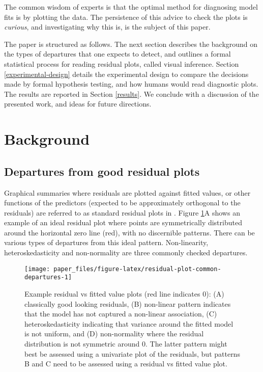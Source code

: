 \documentclass[]{interact}
\theoremstyle{plain}%
\theoremstyle{definition}
\theoremstyle{remark}
\begin{document}
The common wisdom of experts is that the optimal method for diagnosing
model fits is by plotting the data. The persistence of this advice to
check the plots is \emph{curious}, and investigating why this is, is the
subject of this paper.

The paper is structured as follows. The next section describes the
background on the types of departures that one expects to detect, and
outlines a formal statistical process for reading residual plots, called
visual inference. Section \ref{experimental-design} details the
experimental design to compare the decisions made by formal hypothesis
testing, and how humans would read diagnostic plots. The results are
reported in Section \ref{results}. We conclude with a discussion of the
presented work, and ideas for future directions.

\hypertarget{background}{%
\section{Background}\label{background}}

\hypertarget{departures-from-good-residual-plots}{%
\subsection{Departures from good residual
plots}\label{departures-from-good-residual-plots}}

Graphical summaries where residuals are plotted against fitted values,
or other functions of the predictors (expected to be approximately
orthogonal to the residuals) are referred to as standard residual plots
in \citet{cook1982residuals}. Figure
\ref{fig:residual-plot-common-departures}A shows an example of an ideal
residual plot where points are symmetrically distributed around the
horizontal zero line (red), with no discernible patterns. There can be
various types of departures from this ideal pattern. Non-linearity,
heteroskedasticity and non-normality are three commonly checked
departures.

\begin{figure}[t!]

{\centering \texttt{[image: paper\_files/figure-latex/residual-plot-common-departures-1]} 

}

\caption{Example residual vs fitted value plots (red line indicates 0): (A) classically good looking residuals, (B) non-linear pattern indicates that the model has not captured a non-linear association, (C) heteroskedasticity indicating that variance around the fitted model is not uniform, and (D) non-normality where the residual distribution is not symmetric around 0. The latter pattern might best be assessed using a univariate plot of the residuals, but patterns B and C need to be assessed using a residual vs fitted value plot.}\label{fig:residual-plot-common-departures}
\end{figure}
\end{document}
